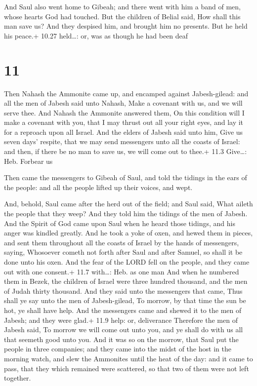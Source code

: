  And Saul also went home to Gibeah; and there went with
him a band of men, whose hearts God had touched.  But the
children of Belial said, How shall this man save us? And they despised
him, and brought him no presents. But he held his peace.+ 10.27
held\ldots: or, was as though he had been deaf

\hypertarget{section-10}{%
\section{11}\label{section-10}}

 Then Nahash the Ammonite came up, and encamped against
Jabesh-gilead: and all the men of Jabesh said unto Nahash, Make a
covenant with us, and we will serve thee.  And Nahash the
Ammonite answered them, On this condition will I make a covenant with
you, that I may thrust out all your right eyes, and lay it for a
reproach upon all Israel.  And the elders of Jabesh said
unto him, Give us seven days' respite, that we may send messengers unto
all the coasts of Israel: and then, if there be no man to save us, we
will come out to thee.+ 11.3 Give\ldots: Heb. Forbear us

 Then came the messengers to Gibeah of Saul, and told the
tidings in the ears of the people: and all the people lifted up their
voices, and wept.

 And, behold, Saul came after the herd out of the field; and
Saul said, What aileth the people that they weep? And they told him the
tidings of the men of Jabesh.  And the Spirit of God came
upon Saul when he heard those tidings, and his anger was kindled
greatly.  And he took a yoke of oxen, and hewed them in
pieces, and sent them throughout all the coasts of Israel by the hands
of messengers, saying, Whosoever cometh not forth after Saul and after
Samuel, so shall it be done unto his oxen. And the fear of the LORD fell
on the people, and they came out with one consent.+ 11.7 with\ldots:
Heb. as one man  And when he numbered them in Bezek, the
children of Israel were three hundred thousand, and the men of Judah
thirty thousand.  And they said unto the messengers that
came, Thus shall ye say unto the men of Jabesh-gilead, To morrow, by
that time the sun be hot, ye shall have help. And the messengers came
and shewed it to the men of Jabesh; and they were glad.+ 11.9 help: or,
deliverance  Therefore the men of Jabesh said, To morrow we
will come out unto you, and ye shall do with us all that seemeth good
unto you.  And it was so on the morrow, that Saul put the
people in three companies; and they came into the midst of the host in
the morning watch, and slew the Ammonites until the heat of the day: and
it came to pass, that they which remained were scattered, so that two of
them were not left together.

